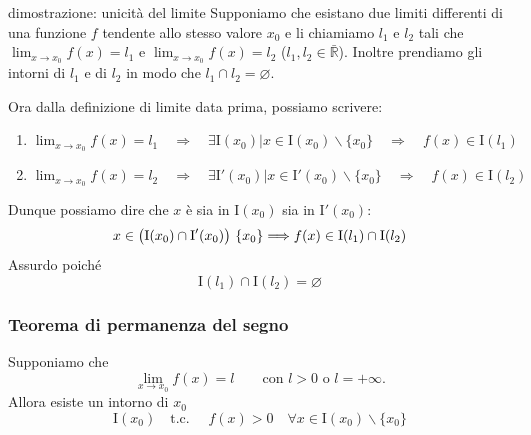\documentclass[x11names]{article}
\begin{document}
	
	\begin{es}{dimostrazione: unicità del limite} 
		Supponiamo che esistano due limiti differenti di una funzione $f$ tendente allo stesso valore $x_0$ e li chiamiamo $l_1$ e $l_2$ tali che $\lim_{x\to x_0}f\left(x\right) = l_1$ e $\lim_{ x\to x_0}f\left(x\right) = l_2$ ($l_{1},l_{2} \in \bar{\mathbb{R}}$). Inoltre prendiamo gli intorni di  $l_1$ e di $l_2$ in modo che $l_1 \cap l_2 = \varnothing$.
		
		\begin{center}
			
		\end{center}
		
		
		Ora dalla definizione di limite data prima, possiamo scrivere:
		\begin{enumerate}
			\item $\lim_{x\to x_0}f\left(x\right) = l_1 \quad \Rightarrow \quad  \exists \text{I}\left(x_0\right) | x \in \text{I}\left(x_0\right) \backslash \{x_0\} \quad \Rightarrow \quad f\left(x\right) \in \text{I}\left(l_1\right)$
			\item $\lim_{x\to x_0}f\left(x\right) = l_2 \quad \Rightarrow \quad  \exists \text{I}'\left(x_0\right) | x \in \text{I}'\left(x_0\right) \backslash \{x_0\} \quad \Rightarrow \quad f\left(x\right) \in \text{I}\left(l_2\right)$
		\end{enumerate}
		Dunque possiamo dire che $x$ è sia in $\text{I}(x_0)$ sia in $\text{I}'(x_0)$:
		\[
		x \in \left(\text{I}(x_0) \cap \text{I}'(x_0)\right)\\ \left\{x_0\right\} \Longrightarrow f(x) \in \text{I}(l_1) \cap \text{I}(l_2)
		\]
		Assurdo poiché
		\[
		\text{I}(l_1) \cap \text{I}(l_2) = \varnothing
		\]
	\end{es}
	
	
	\begin{center}
		\colorbox{myred}{\begin{minipage}{5.75in}
				\begin{redes}{}
					\subsubsection{Teorema di permanenza del segno}
					Supponiamo che 
					\[
					\lim_{x \to x_0}f(x) = l \qquad \text{con } l>0 \text{ o } l = +\infty.
					\]
					Allora esiste un intorno di $x_0$
					\[
					\text{I}(x_0) \quad \text{t.c. } \quad f(x) > 0 \quad \forall x \in \text{I}(x_0) \backslash \{x_0\}
					\]
				\end{redes}
		\end{minipage}}        
	\end{center}
	
\end{document}
